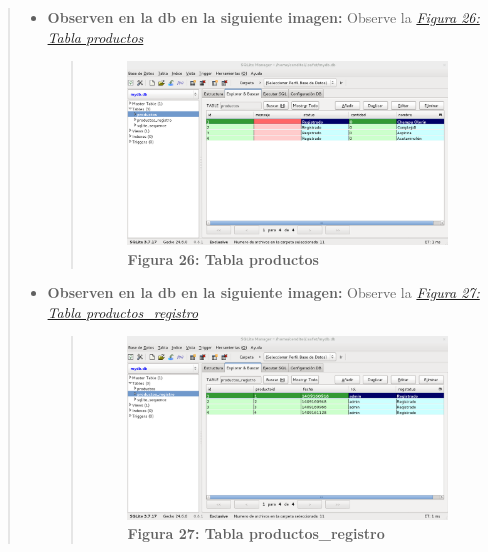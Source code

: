 \documentclass[letterpaper,11pt,spanish]{sphinxmanual}
\begin{document}
\begin{quote}
\begin{quote}
\begin{quote}
\begin{description}
\end{description}\end{quote}
\end{quote}
\begin{itemize}
\item {} 
\textbf{Observen en la db en la siguiente imagen:} Observe la {\hyperref[_templates/Contenido6/Parte2:figura2]{\emph{Figura 26: Tabla productos}}}
\begin{quote}
\begin{figure}[htbp]
\centering
\capstart

\includegraphics{Eliminar1.png}
\caption{\textbf{Figura 26: Tabla productos}}\label{_templates/Contenido6/Parte2:figura2}\end{figure}
\end{quote}

\item {} 
\textbf{Observen en la db en la siguiente imagen:} Observe la {\hyperref[_templates/Contenido6/Parte2:figura3]{\emph{Figura 27: Tabla productos\_registro}}}
\begin{quote}
\begin{figure}[htbp]
\centering
\capstart

\includegraphics{Eliminar2.png}
\caption{\textbf{Figura 27: Tabla productos\_registro}}\label{_templates/Contenido6/Parte2:figura3}\end{figure}
\end{quote}

\end{itemize}
\end{quote}
\end{document}

